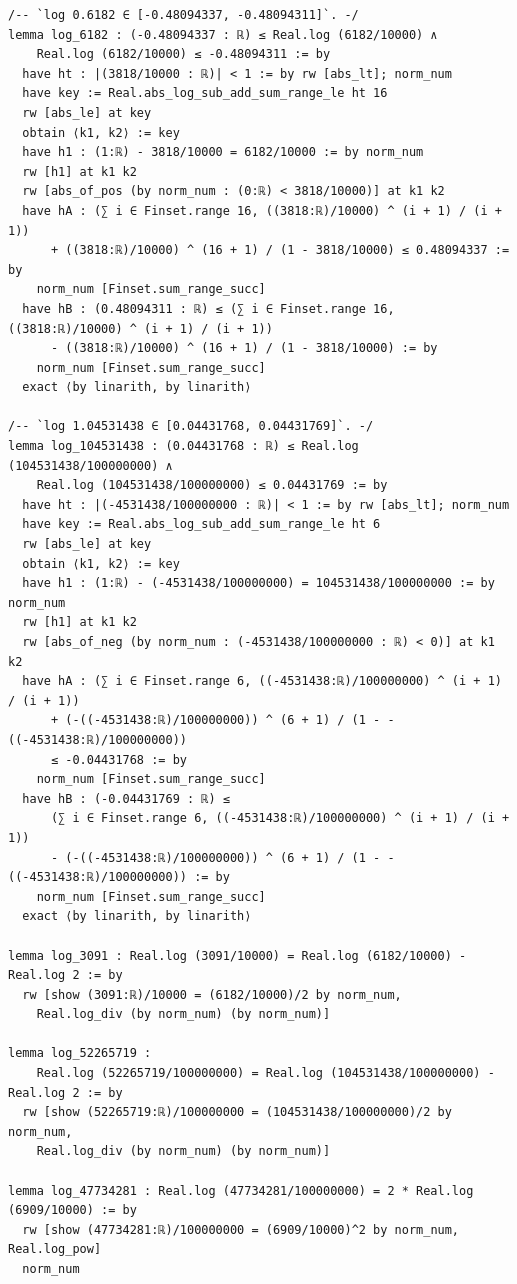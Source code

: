 \documentclass[11pt,a4paper]{article}
\theoremstyle{definition}
\theoremstyle{remark}
\begin{document}
\begin{Verbatim}[fontsize=\scriptsize,formatcom=\leanmono,samepage=false]
/-- `log 0.6182 ∈ [-0.48094337, -0.48094311]`. -/
lemma log_6182 : (-0.48094337 : ℝ) ≤ Real.log (6182/10000) ∧
    Real.log (6182/10000) ≤ -0.48094311 := by
  have ht : |(3818/10000 : ℝ)| < 1 := by rw [abs_lt]; norm_num
  have key := Real.abs_log_sub_add_sum_range_le ht 16
  rw [abs_le] at key
  obtain ⟨k1, k2⟩ := key
  have h1 : (1:ℝ) - 3818/10000 = 6182/10000 := by norm_num
  rw [h1] at k1 k2
  rw [abs_of_pos (by norm_num : (0:ℝ) < 3818/10000)] at k1 k2
  have hA : (∑ i ∈ Finset.range 16, ((3818:ℝ)/10000) ^ (i + 1) / (i + 1))
      + ((3818:ℝ)/10000) ^ (16 + 1) / (1 - 3818/10000) ≤ 0.48094337 := by
    norm_num [Finset.sum_range_succ]
  have hB : (0.48094311 : ℝ) ≤ (∑ i ∈ Finset.range 16, ((3818:ℝ)/10000) ^ (i + 1) / (i + 1))
      - ((3818:ℝ)/10000) ^ (16 + 1) / (1 - 3818/10000) := by
    norm_num [Finset.sum_range_succ]
  exact ⟨by linarith, by linarith⟩

/-- `log 1.04531438 ∈ [0.04431768, 0.04431769]`. -/
lemma log_104531438 : (0.04431768 : ℝ) ≤ Real.log (104531438/100000000) ∧
    Real.log (104531438/100000000) ≤ 0.04431769 := by
  have ht : |(-4531438/100000000 : ℝ)| < 1 := by rw [abs_lt]; norm_num
  have key := Real.abs_log_sub_add_sum_range_le ht 6
  rw [abs_le] at key
  obtain ⟨k1, k2⟩ := key
  have h1 : (1:ℝ) - (-4531438/100000000) = 104531438/100000000 := by norm_num
  rw [h1] at k1 k2
  rw [abs_of_neg (by norm_num : (-4531438/100000000 : ℝ) < 0)] at k1 k2
  have hA : (∑ i ∈ Finset.range 6, ((-4531438:ℝ)/100000000) ^ (i + 1) / (i + 1))
      + (-((-4531438:ℝ)/100000000)) ^ (6 + 1) / (1 - -((-4531438:ℝ)/100000000))
      ≤ -0.04431768 := by
    norm_num [Finset.sum_range_succ]
  have hB : (-0.04431769 : ℝ) ≤
      (∑ i ∈ Finset.range 6, ((-4531438:ℝ)/100000000) ^ (i + 1) / (i + 1))
      - (-((-4531438:ℝ)/100000000)) ^ (6 + 1) / (1 - -((-4531438:ℝ)/100000000)) := by
    norm_num [Finset.sum_range_succ]
  exact ⟨by linarith, by linarith⟩

lemma log_3091 : Real.log (3091/10000) = Real.log (6182/10000) - Real.log 2 := by
  rw [show (3091:ℝ)/10000 = (6182/10000)/2 by norm_num,
    Real.log_div (by norm_num) (by norm_num)]

lemma log_52265719 :
    Real.log (52265719/100000000) = Real.log (104531438/100000000) - Real.log 2 := by
  rw [show (52265719:ℝ)/100000000 = (104531438/100000000)/2 by norm_num,
    Real.log_div (by norm_num) (by norm_num)]

lemma log_47734281 : Real.log (47734281/100000000) = 2 * Real.log (6909/10000) := by
  rw [show (47734281:ℝ)/100000000 = (6909/10000)^2 by norm_num, Real.log_pow]
  norm_num


\end{Verbatim}
\end{document}
